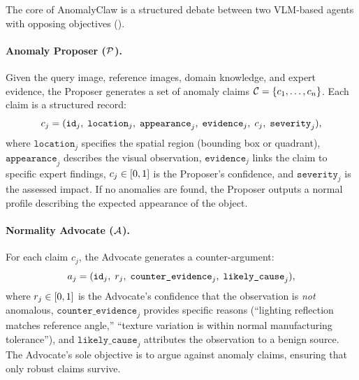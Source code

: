 The core of AnomalyClaw is a structured debate between two VLM-based agents with opposing objectives ().

\paragraph{Anomaly Proposer ($\mathcal{P}$).}
Given the query image, reference images, domain knowledge, and expert evidence, the Proposer generates a set of anomaly claims $\mathcal{C} = \{c_1, \ldots, c_n\}$.
Each claim is a structured record:
\begin{equation}
    c_j = (\texttt{id}_j,\; \texttt{location}_j,\; \texttt{appearance}_j,\; \texttt{evidence}_j,\; c_j,\; \texttt{severity}_j),
    \label{eq:claim}
\end{equation}
where $\texttt{location}_j$ specifies the spatial region (bounding box or quadrant), $\texttt{appearance}_j$ describes the visual observation, $\texttt{evidence}_j$ links the claim to specific expert findings, $c_j \in [0,1]$ is the Proposer's confidence, and $\texttt{severity}_j$ is the assessed impact.
If no anomalies are found, the Proposer outputs a normal profile describing the expected appearance of the object.

\paragraph{Normality Advocate ($\mathcal{A}$).}
For each claim $c_j$, the Advocate generates a counter-argument:
\begin{equation}
    a_j = (\texttt{id}_j,\; r_j,\; \texttt{counter\_evidence}_j,\; \texttt{likely\_cause}_j),
    \label{eq:refutation}
\end{equation}
where $r_j \in [0,1]$ is the Advocate's confidence that the observation is \emph{not} anomalous, $\texttt{counter\_evidence}_j$ provides specific reasons (``lighting reflection matches reference angle,'' ``texture variation is within normal manufacturing tolerance''), and $\texttt{likely\_cause}_j$ attributes the observation to a benign source.
The Advocate's sole objective is to argue against anomaly claims, ensuring that only robust claims survive.

